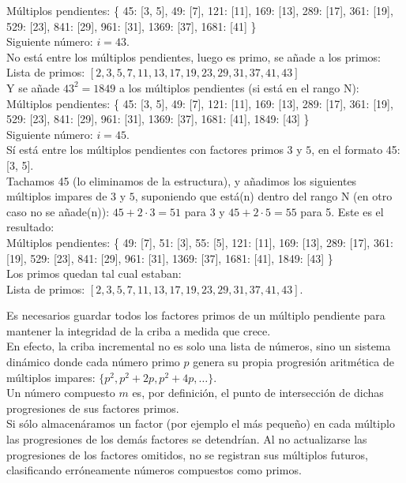 \begin{ejemplo}
Múltiplos pendientes: \{ 45: [3, 5], 49: [7], 121: [11], 169: [13], 289: [17], 361: [19], 529: [23], 841: [29], 961: [31], 1369: [37], 1681: [41] \} \\
Siguiente número: $i = 43$. \\
No está entre los múltiplos pendientes, luego es primo, se añade a los primos: \\
Lista de primos: $[2, 3, 5, 7, 11, 13, 17, 19, 23, 29, 31, 37, 41, 43]$ \\
Y se añade $43^2 = 1849$ a los múltiplos pendientes (si está en el rango N):\\
Múltiplos pendientes: \{ 45: [3, 5], 49: [7], 121: [11], 169: [13], 289: [17], 361: [19], 529: [23], 841: [29], 961: [31], 1369: [37], 1681: [41], 1849: [43] \} \\
Siguiente número: $i = 45$. \\
Sí está entre los múltiplos pendientes con factores primos $3$ y $5$, en el formato 45: [3, 5]. \\
Tachamos 45 (lo eliminamos de la estructura), y añadimos los siguientes múltiplos impares de $3$ y $5$, suponiendo que está(n) dentro del rango N (en otro caso no se añade(n)): $45+2\cdot3=51$ para 3 y $45+2\cdot5=55$ para 5. Este es el resultado: \\
Múltiplos pendientes: \{ 49: [7], 51: [3], 55: [5], 121: [11], 169: [13], 289: [17], 361: [19], 529: [23], 841: [29], 961: [31], 1369: [37], 1681: [41], 1849: [43] \} \\
Los primos quedan tal cual estaban: \\
Lista de primos: $[2, 3, 5, 7, 11, 13, 17, 19, 23, 29, 31, 37, 41, 43]$.
\end{ejemplo}

Es necesarios guardar todos los factores primos de un múltiplo pendiente para mantener la integridad de la criba a medida que crece. \\
En efecto, la criba incremental no es solo una lista de números, sino un sistema dinámico donde cada número primo $p$ genera su propia progresión aritmética de múltiplos impares:  $\{p^2, p^2 + 2p, p^2 + 4p, \dots \}$. \\
Un número compuesto $m$ es, por definición, el punto de intersección de dichas progresiones de sus factores primos. \\
Si sólo almacenáramos un factor (por ejemplo el más pequeño) en cada múltiplo las progresiones  de los demás factores se detendrían. Al no actualizarse las progresiones de los factores omitidos, no se registran sus múltiplos futuros, clasificando erróneamente números compuestos como primos.

